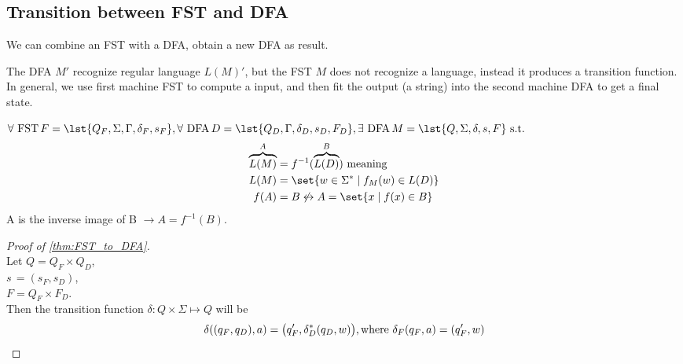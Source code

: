 
\subsection{Transition between FST and DFA}

We can combine an FST with a DFA, obtain a new DFA as result.

The DFA $M'$ recognize regular language $L(M)'$, but the FST $M$ does not recognize a
language, instead it produces a transition function. In general, we use first machine FST
to compute a input, and then fit the output (a string) into the second machine DFA to get
a final state.

\begin{theorem}
    \label{thm:FST_to_DFA} 
    $
    \forall \text{ \upshape FST} \, F = \lst{Q_F, \Sigma,\Gamma, \delta_F, s_F}, \\
    \forall \text{ \upshape DFA} \, D = \lst{Q_D, \Gamma, \delta_D, s_D, F_D}, \\
    \exists \text{ \upshape DFA} \, M = \lst{Q, \Sigma, \delta, s, F} 
    \text{ s.t. \ }
    $
    \begin{align*}
        \overbrace{L(M)}^A &= f^{-1}(\overbrace{L(D)}^B) \text{ meaning }\\
        L(M) &= \set {w \in \Sigma^* \mid f_M(w) \in L(D)} \\
        f(A) &= B \not \leftrightarrow A = \set{x \mid f(x) \in B} 
    \end{align*}
    A is the inverse image of B $\rightarrow A = f^{-1}(B)$.
\end{theorem}

\begin{proof}[Proof of \autoref{thm:FST_to_DFA}] \ \\
    Let $Q = Q_F \times Q_D$,\\
    \phantom{Let}$s\,=(s_F,s_D) $,\\
    \phantom{Let}$F  = Q_F \times F_D$.\\
    Then the transition function 
    $
    \delta \colon Q \times \Sigma \mapsto Q
    $
    will be
    \[
        \delta((q_F,q_D),a) = \big( q_F', \delta_D^*(q_D,w)\big),
        \text{\upshape where }\delta_F(q_F,a) = (q_F',w) 
    \]
\end{proof}

\begin{theorem}
\end{theorem}

